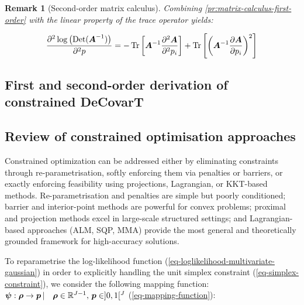 \documentclass[pdflatex, sn-nature]{sn-jnl}
\theoremstyle{thmstyleone}%
\theoremstyle{thmstyletwo}%
\newtheorem{remark}{Remark}%
\theoremstyle{thmstylethree}%
\begin{document}
\begin{appendices}
\begin{remark}[Second-order matrix calculus]
            Combining \ref{pr:matrix-calculus-first-order} with the linear property
            of the trace operator yields:

            \begin{equation*}
                \frac{\partial^{2} \log \left(\operatorname*{Det} (\boldsymbol{A}^{-1})\right)}{\partial^{2}
                p}= - \operatorname*{Tr} \left[\boldsymbol{A}^{-1}\frac{\partial^{2} \boldsymbol{A}}{\partial^{2}
                p_{i}}\right] + \operatorname*{Tr} \left[\left(\boldsymbol{A}^{-1}\frac{\partial
                \boldsymbol{A}}{\partial p_{i}}\right)^{2}\right]
            \end{equation*}
        \end{remark}

        \clearpage

        \subsection{First and second-order derivation of constrained DeCovarT}
        \label{subsec:contrained-optimisation}

        \subsection{Review of constrained optimisation approaches}

        Constrained optimization can be addressed either by eliminating constraints
        through re-parametrisation, softly enforcing them via penalties or
        barriers, or exactly enforcing feasibility using projections, Lagrangian,
        or KKT-based methods. Re-parametrisation and penalties are simple but
        poorly conditioned; barrier and interior-point methods are powerful for convex
        problems; proximal and projection methods excel in large-scale
        structured settings; and Lagrangian-based approaches (ALM, SQP, MMA) provide
        the most general and theoretically grounded framework for high-accuracy solutions.

        To reparametrise the log-likelihood function (\ref{eq-loglikelihood-multivariate-gaussian})
        in order to explicitly handling the unit simplex constraint (\ref{eq-simplex-constraint}),
        we consider the following mapping function: $\boldsymbol{\psi}:\boldsymbol
        {\rho}\to \boldsymbol{p}\, | \quad \boldsymbol{\rho}\in \mathbb{R}^{J-1}, \,
        \boldsymbol{p}\in ]0, 1[^{J}$ (\ref{eq-mapping-function}):


\end{appendices}
\end{document}
